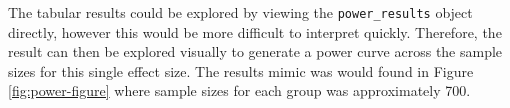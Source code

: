 \documentclass[man,mask,floatsintext]{apa6}
\newenvironment{Shaded}{\begin{snugshade}}{\end{snugshade}}
\newcommand{\DataTypeTok}[1]{\textcolor[rgb]{0.13,0.29,0.53}{#1}}
\newcommand{\KeywordTok}[1]{\textcolor[rgb]{0.13,0.29,0.53}{\textbf{#1}}}
\newcommand{\NormalTok}[1]{#1}
\newcommand{\OperatorTok}[1]{\textcolor[rgb]{0.81,0.36,0.00}{\textbf{#1}}}
\newcommand{\OtherTok}[1]{\textcolor[rgb]{0.56,0.35,0.01}{#1}}
\newcommand{\StringTok}[1]{\textcolor[rgb]{0.31,0.60,0.02}{#1}}
\begin{document}
\begin{Shaded}
\end{Shaded}

The tabular results could be explored by viewing the \texttt{power\_results} object directly, however this would be more difficult to interpret quickly. Therefore, the result can then be explored visually to generate a power curve across the sample sizes for this single effect size. The results mimic was would found in Figure \ref{fig:power-figure} where sample sizes for each group was approximately 700.
\end{document}
